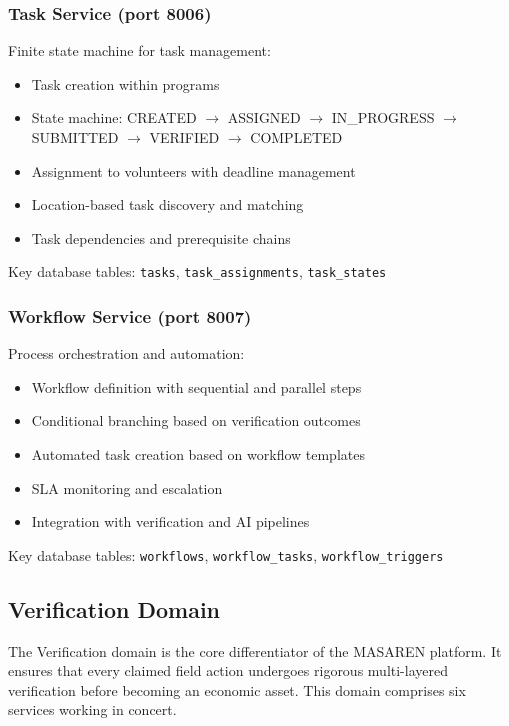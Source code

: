 \documentclass[11pt,a4paper]{article}
\begin{document}
\subsubsection{Task Service (port 8006)}

Finite state machine for task management:
\begin{itemize}
  \item Task creation within programs
  \item State machine: CREATED $\rightarrow$ ASSIGNED $\rightarrow$ IN\_PROGRESS $\rightarrow$ SUBMITTED $\rightarrow$ VERIFIED $\rightarrow$ COMPLETED
  \item Assignment to volunteers with deadline management
  \item Location-based task discovery and matching
  \item Task dependencies and prerequisite chains
\end{itemize}

Key database tables: \texttt{tasks}, \texttt{task\_assignments}, \texttt{task\_states}

\subsubsection{Workflow Service (port 8007)}

Process orchestration and automation:
\begin{itemize}
  \item Workflow definition with sequential and parallel steps
  \item Conditional branching based on verification outcomes
  \item Automated task creation based on workflow templates
  \item SLA monitoring and escalation
  \item Integration with verification and AI pipelines
\end{itemize}

Key database tables: \texttt{workflows}, \texttt{workflow\_tasks}, \texttt{workflow\_triggers}

\subsection{Verification Domain}

The Verification domain is the core differentiator of the MASAREN platform. It ensures that every claimed field action undergoes rigorous multi-layered verification before becoming an economic asset. This domain comprises six services working in concert.
\end{document}
